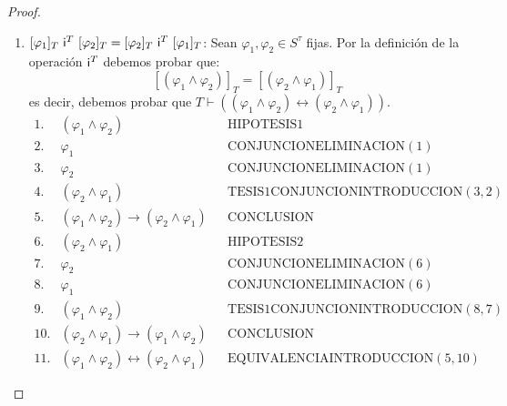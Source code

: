 \begin{proof}
\begin{enumerate}[(1)]
      \item $[\varphi_{1}]_{T} \ \IN^{T} \ [\varphi_{2}]_{T} = [\varphi_{2}]_{T} \ \IN^{T} \ [\varphi_{1}]_{T}$: Sean
        $\varphi_{1}, \varphi_{2} \in S^{\tau}$ fijas. Por la definición de la operación $\mathsf{i}^{T}$ debemos probar que:
        \[
          [(\varphi_{1} \wedge \varphi_{2})]_{T} = [(\varphi_{2} \wedge \varphi_{1})]_{T}
        \]
        \PN es decir, debemos probar que $T \vdash ((\varphi_{1} \wedge \varphi_{2}) \leftrightarrow (\varphi_{2} \wedge
        \varphi_{1}))$.
        \[
          \begin{array}{llll}
            1. & (\varphi_{1} \wedge \varphi_{2}) && \text{HIPOTESIS1} \\
            2. & \varphi_{1} && \text{CONJUNCIONELIMINACION}(1) \\
            3. & \varphi_{2} && \text{CONJUNCIONELIMINACION}(1) \\
            4. & (\varphi_{2} \wedge \varphi_{1}) && \text{TESIS1CONJUNCIONINTRODUCCION}(3,2) \\
            5. & (\varphi_{1} \wedge \varphi_{2}) \rightarrow (\varphi_{2} \wedge \varphi_{1}) && \text{CONCLUSION} \\
            6. & (\varphi_{2} \wedge \varphi_{1}) && \text{HIPOTESIS2} \\
            7. & \varphi_{2} && \text{CONJUNCIONELIMINACION}(6) \\
            8. & \varphi_{1} && \text{CONJUNCIONELIMINACION}(6) \\
            9. & (\varphi_{1} \wedge \varphi_{2}) && \text{TESIS1CONJUNCIONINTRODUCCION}(8,7) \\
            10. & (\varphi_{2} \wedge \varphi_{1}) \rightarrow (\varphi_{1} \wedge \varphi_{2}) && \text{CONCLUSION} \\
            11. & (\varphi_{1} \wedge \varphi_{2}) \leftrightarrow (\varphi_{2} \wedge \varphi_{1}) &&
              \text{EQUIVALENCIAINTRODUCCION}(5,10)
          \end{array}
        \]


\end{enumerate}
\end{proof}

